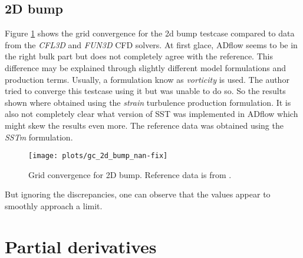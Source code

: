\subsection{2D bump}
Figure \ref{fig:gc_2d_bump} shows the grid convergence for the 2d bump testcase
compared to data from the \textit{CFL3D} and \textit{FUN3D} CFD solvers. At
first glace, ADflow seems to be in the right bulk part but does not completely
agree with the reference. This difference may be explained through slightly
different model formulations and production terms. Usually, a formulation know
as \textit{vorticity} is used. The author tried to converge this testcase using
it but was unable to do so. So the results shown where obtained using the
\textit{strain} turbulence production formulation. It is also not completely
clear what version of SST was implemented in ADflow which might skew the
results even more. The reference data was obtained using the \textit{SSTm}
formulation. 

\begin{figure}[H] \centering
    \texttt{[image: plots/gc\_2d\_bump\_nan-fix]}
    \caption{Grid convergence for 2D bump. Reference data is from
    \cite{nasatmr}.}
    \label{fig:gc_2d_bump}
\end{figure}

\noindent But ignoring the discrepancies, one can observe that the values
appear to smoothly approach a limit.







\section{Partial derivatives}

